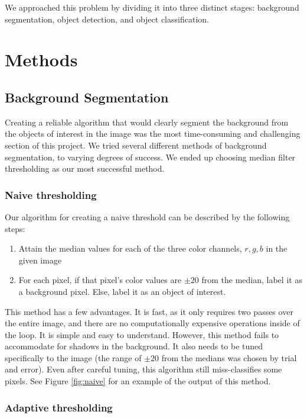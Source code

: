 \documentclass[12pt]{article}
\begin{document}
We approached this problem by dividing it into three distinct stages: background segmentation, object detection, and object classification.

\section{Methods}

\subsection{Background Segmentation}

Creating a reliable algorithm that would clearly segment the background from the objects of interest in the image was the most time-consuming and challenging section of this project. We tried several different methods of background segmentation, to varying degrees of success. We ended up choosing median filter thresholding as our most successful method.

\subsubsection{Naive thresholding}

Our algorithm for creating a naive threshold can be described by the following steps:
\begin{enumerate}
	\item Attain the median values for each of the three color channels, $r,g,b$ in the given image
	\item For each pixel, if that pixel's color values are $\pm20$ from the median, label it as a background pixel. Else, label it as an object of interest.
\end{enumerate}

This method has a few advantages. It is fast, as it only requires two passes over the entire image, and there are no computationally expensive operations inside of the loop. It is simple and easy to understand. However, this method fails to accommodate for shadows in the background. It also needs to be tuned specifically to the image (the range of $\pm20$ from the medians was chosen by trial and error). Even after careful tuning, this algorithm still miss-classifies some pixels. See Figure \ref{fig:naive} for an example of the output of this method.

\subsubsection{Adaptive thresholding}
\end{document}
